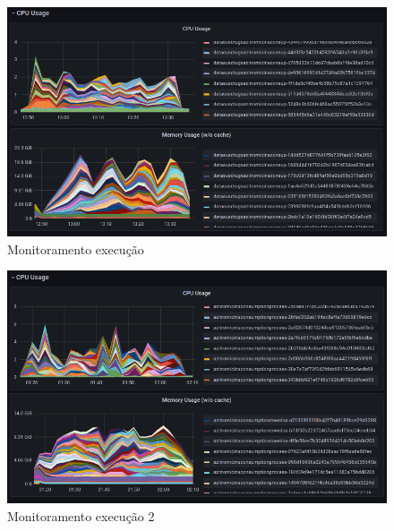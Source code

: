 \documentclass[10pt,brazil]{beamer}
\theoremstyle{definition}
\begin{document}
\begin{frame}[plain]
  \hspace*{-10mm}
  \begin{figure}
    \centering  
  \includegraphics[width=.75\paperwidth]{etl_1_usage.png}
      \caption[Monitoramento execução]{Monitoramento execução}
  \end{figure}  
\end{frame}

\begin{frame}[plain]
  \hspace*{-10mm}
    \begin{figure}
    \centering  
  \includegraphics[width=.75\paperwidth]{etl_2_usage.png}
      \caption[Monitoramento execução 2]{Monitoramento execução 2}
  \end{figure}  
\end{frame}
\end{document}
